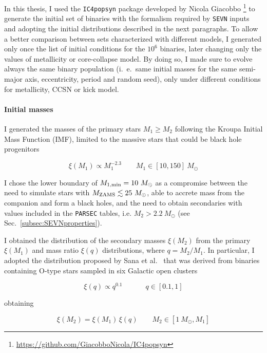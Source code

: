 \documentclass[a4paper,titlepage]{book}     	%
\newcommand{\sun}{\ensuremath{_\odot}}
\newcommand{\mzams}{M_\textup{ZAMS}}
\newcommand{\msun}{\ensuremath{M\sun}}
\begin{document}
In this thesis, I used the \texttt{IC4popsyn} package developed by Nicola Giacobbo \footnote{\url{https://github.com/GiacobboNicola/IC4popsyn}} to generate the initial set of binaries with the formalism required by \texttt{SEVN} inputs and adopting the initial distributions described in the next paragraphs. To allow a better comparison between sets characterized with different models, I generated only once the list of initial conditions for the $10^6$ binaries, later changing only the values of metallicity or core-collapse model. By doing so, I made sure to evolve always the same binary population (i.\ e.\ same initial masses for the same semi-major axis, eccentricity, period and random seed), only under different conditions for metallicity, CCSN or kick model.

\paragraph{Initial masses} I generated the masses of the primary stars $M_1 \geq M_2$ following the Kroupa \cite{Kroupa2001} Initial Mass Function (IMF), limited to the massive stars that could be black hole progenitors

\begin{equation}
	\xi(M_1) \propto M_1^{-2.3} \qquad M_1 \in [10,150]~\msun 
\end{equation}

I chose the lower boundary of $M_\textup{1,min} = 10~\msun$ as a compromise between the need to simulate stars with $\mzams \lesssim 25~\msun$, able to accrete mass from the companion and form a black holes, and the need to obtain secondaries with values included in the \texttt{PARSEC} tables, i.e. $M_2 > 2.2~\msun$ (see Sec.\ \ref{subsec:SEVNproperties}).

I obtained the distribution of the secondary masses $\xi(M_2)$ from the primary $\xi(M_1)$ and mass ratio $\xi(q)$ distributions, where $q=M_2/M_1$. In particular, I adopted the distribution proposed by Sana et al.\ \cite{Sana2012} that was derived from binaries containing O-type stars sampled in six Galactic open clusters

\begin{equation}
\xi(q) \propto q^{0.1} \qquad \quad ~q \in [0.1,1] 
\end{equation}

obtaining

\begin{equation}
\xi(M_2) = \xi(M_1) \,{} \xi(q)  \qquad  M_2 \in [1 ~\msun , M_1]
\end{equation}
\end{document}
